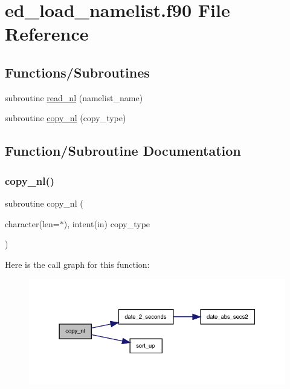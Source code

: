 \hypertarget{ed__load__namelist_8f90}{}\section{ed\+\_\+load\+\_\+namelist.\+f90 File Reference}
\label{ed__load__namelist_8f90}
\subsection*{Functions/\+Subroutines}
\begin{DoxyCompactItemize}
\item 
subroutine \hyperlink{ed__load__namelist_8f90_a74dbabc7eca04f03fced064fb5389c57}{read\+\_\+nl} (namelist\+\_\+name)
\item 
subroutine \hyperlink{ed__load__namelist_8f90_a6c55a5dcbe1f908f9e2599d577e8a2d2}{copy\+\_\+nl} (copy\+\_\+type)
\end{DoxyCompactItemize}


\subsection{Function/\+Subroutine Documentation}
\mbox{\label{ed__load__namelist_8f90_a6c55a5dcbe1f908f9e2599d577e8a2d2}} 
\subsubsection{\texorpdfstring{copy\+\_\+nl()}{copy\_nl()}}
{\footnotesize\ttfamily subroutine copy\+\_\+nl (\begin{DoxyParamCaption}\item[{character(len=$\ast$), intent(in)}]{copy\+\_\+type }\end{DoxyParamCaption})}

Here is the call graph for this function\+:
\nopagebreak
\begin{figure}[H]
\begin{center}
\leavevmode
\includegraphics[width=337pt]{ed__load__namelist_8f90_a6c55a5dcbe1f908f9e2599d577e8a2d2_cgraph}
\end{center}
\end{figure}
\mbox{\label{ed__load__namelist_8f90_a74dbabc7eca04f03fced064fb5389c57}} 

